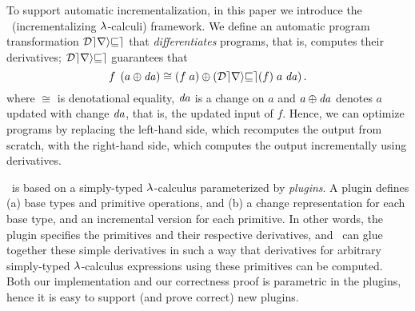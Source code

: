To support automatic incrementalization, in this paper we introduce the \ILC\
(incrementalizing $\lambda$-calculi) framework. We define
an automatic program transformation $\mathcal{Derive}$
that \emph{differentiates} programs, that is, computes their
derivatives; $\mathcal{Derive}$ guarantees that
\begin{equation}
  \label{eq:correctness}
\App{f}{\Apply*{\D a}{a}}
\cong
\Apply{\App*{\App{\Derive{f}}{a}}{\D a}}{\App*{f}{a}}.
\end{equation}
where
$\cong$ is denotational equality,
$\mathit{da}$ is a change on $a$ and $\Apply{\D a}{a}$ denotes $a$
updated with change $\mathit{da}$, that is, the updated input of $f$.
Hence, we can optimize programs by replacing the left-hand side,
which recomputes the output from scratch, with the right-hand
side, which computes the output incrementally using derivatives.

\ILC\ is based on a simply-typed $\lambda$-calculus
parameterized by \emph{plugins}. A plugin
defines
%
(a) base types and primitive operations, and
%
(b) a change representation for each base type, and an
incremental version for each primitive. In other words, the plugin
specifies the primitives and their respective derivatives, and
\ILC\ can glue together these simple derivatives in such a way
that derivatives for arbitrary simply-typed $\lambda$-calculus expressions
using these primitives can be computed. Both our implementation and our correctness proof 
is parametric in the plugins, hence it is easy to support (and prove correct)
new plugins.

